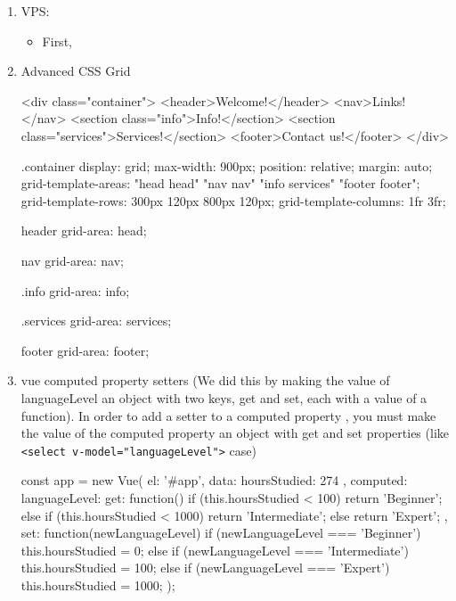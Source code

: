 \documentclass[a4paper,12pt]{article}
\begin{document}
\fontsize{14pt}{15.6pt}
\selectfont


\begin{enumerate}

\item VPS:
\begin{itemize}
  \item First,
\end{itemize}

\item Advanced CSS Grid
\begin{htmlcode}
<div class="container">
  <header>Welcome!</header>
  <nav>Links!</nav>
  <section class="info">Info!</section>
  <section class="services">Services!</section>
  <footer>Contact us!</footer>
</div>
\end{htmlcode}

\begin{htmlcode}
.container {
  display: grid;
  max-width: 900px;
  position: relative;
  margin: auto;
  grid-template-areas: "head head"
                       "nav nav" 
                       "info services"
                       "footer footer";
  grid-template-rows: 300px 120px 800px 120px;
  grid-template-columns: 1fr 3fr; 
}

header {
  grid-area: head;
} 

nav {
  grid-area: nav;
} 

.info {
  grid-area: info;
} 

.services {
  grid-area: services;
}

footer {
  grid-area: footer;
}
\end{htmlcode}

\item vue computed property setters (We did this by making the value of languageLevel an object with two keys, get and set, each with a value of a function). In order to add a setter to a computed property , you must make the value of the computed property an object with get and set properties (like \verb|<select v-model="languageLevel">| case)
\begin{jscode}
const app = new Vue({
  el: '#app',
  data: {
    hoursStudied: 274
  },
  computed: {
    languageLevel: {
      get: function() {
        if (this.hoursStudied < 100) {
          return 'Beginner';
        } else if (this.hoursStudied < 1000) {
          return 'Intermediate';
        } else {
          return 'Expert';
        }
      },
      set: function(newLanguageLevel) {
        if (newLanguageLevel === 'Beginner') {
          this.hoursStudied = 0;
        } else if (newLanguageLevel === 'Intermediate') {
          this.hoursStudied = 100;
        } else if (newLanguageLevel === 'Expert') {
          this.hoursStudied = 1000;
        }
      }
    }
  }
});


\end{jscode}
\end{enumerate}
\end{document}
